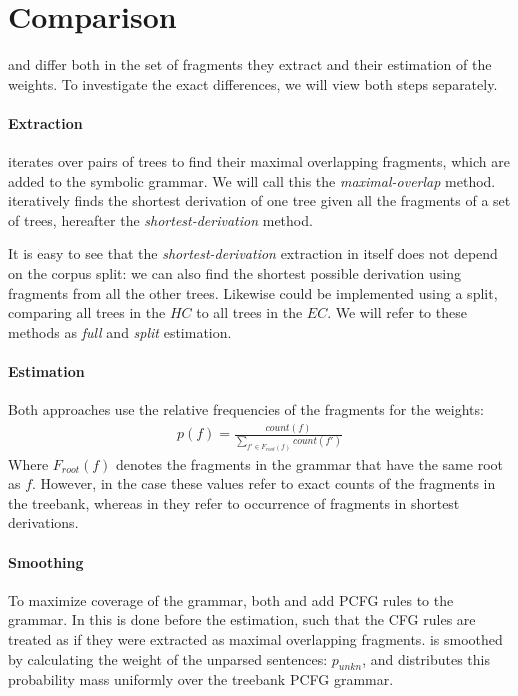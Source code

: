 
\section{Comparison} \label{sec:Comparison}
\dops{} and \ddop{} differ both in the set of fragments they extract and their estimation of the weights. To investigate the exact differences, we will view both steps separately.

\paragraph{Extraction}

\ddop{} iterates over pairs of trees to find their maximal overlapping fragments, which are added to the symbolic grammar. We will call this the \emph{maximal-overlap} method. \dops{} iteratively finds the shortest derivation of one tree given all the fragments of a set of trees, hereafter the \emph{shortest-derivation} method. 

It is easy to see that the \emph{shortest-derivation} extraction in itself does not depend on the corpus split: we can also find the shortest possible derivation using fragments from all the other trees. Likewise \ddop{} could be implemented using a split, comparing all trees in the $HC$ to all trees in the $EC$.
We will refer to these methods as \emph{full} and \emph{split} estimation.

\paragraph{Estimation}

Both approaches use the relative frequencies of the fragments for the weights:
\begin{align}p(f)=\frac{count(f)}{\sum_{f'\in F_{root}(f)} count(f')}\end{align} 
Where $F_{root}(f)$ denotes the fragments in the grammar that have the same root as $f$.
However, in the \ddop{} case these values refer to exact counts of the fragments in the treebank, whereas in \dops{} they refer to occurrence of fragments in shortest derivations.

\paragraph{Smoothing}
To maximize coverage of the grammar, both \ddop{} and \dops{} add PCFG rules to the grammar. In \ddop{} this is done before the estimation, such that the CFG rules are treated as if they were extracted as maximal overlapping fragments.
\dops{} is smoothed by calculating the weight of the unparsed sentences: $p_{unkn}$, and distributes this probability mass uniformly over the treebank PCFG grammar.




